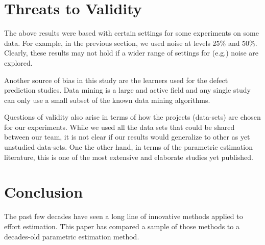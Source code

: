 \documentclass{sig-alternate}
\begin{document}
\section{Threats to Validity}

The above results were based with certain settings for some experiments on some data. 
For example, in the previous section, we used noise at levels 25\% and 50\%.
Clearly, these results may not hold if a wider range of settings for (e.g.) noise are explored.






Another source of bias in this study
are the learners used for the defect prediction
studies. Data mining is a large and active field and
any single study can only use a small subset of the
known data mining algorithms.  

Questions of validity also arise in terms of how the
projects (data-sets) are chosen for our experiments.
While we used all the data sets that could be shared
between our team, it is not clear if our results
would generalize to other as yet unstudied
data-sets. One the other hand, in terms of the
parametric estimation literature, this is one of the most extensive
and elaborate studies yet published.
 
 
\section{Conclusion}
The past few decades have seen a long line of innovative  methods
applied to effort estimation. This paper has compared a sample of those methods
to a decades-old parametric estimation method. 
\end{document}
